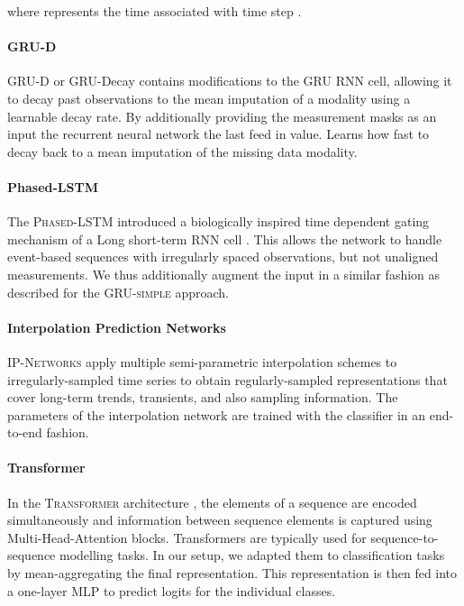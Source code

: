 \documentclass{article}
\newcommand{\method}[1]{\textsc{#1}}
\begin{document}
where  represents the time associated with time step .

\paragraph{GRU-D}
\method{GRU-D} or GRU-Decay \citep{che2018recurrent} contains modifications to the
GRU RNN cell, allowing it to decay past observations to the mean imputation of
a modality using a learnable decay rate. By additionally providing the
measurement masks as an input the recurrent neural network
the last feed in value. Learns how fast to decay back to a mean imputation of
the missing data modality.

\paragraph{Phased-LSTM}
The \method{Phased-LSTM} \citep{neil2016phased} introduced
a biologically inspired time dependent gating mechanism of a Long
short-term RNN cell \citep{hochreiter1997long}. This allows the network
to handle event-based sequences with irregularly spaced observations,
but not unaligned measurements. We thus additionally augment the input
in a similar fashion as described for the \method{GRU-simple} approach.

\paragraph{Interpolation Prediction Networks}
\method{IP-Networks} \citep{shukla2018interpolationprediction} apply
multiple semi-parametric interpolation schemes to irregularly-sampled
time series to obtain regularly-sampled representations that cover
long-term trends, transients, and also sampling information. The
parameters of the interpolation network are trained with the classifier
in an end-to-end fashion.

\paragraph{Transformer}
In the \method{Transformer} architecture \citep{vaswani2017attention},
the elements of a sequence are encoded simultaneously and information
between sequence elements is captured using Multi-Head-Attention blocks.
Transformers are typically used for sequence-to-sequence modelling
tasks. In our setup, we adapted them to classification tasks by
mean-aggregating the final representation.  This representation is then
fed into a one-layer MLP to predict logits for the individual classes.
\end{document}
